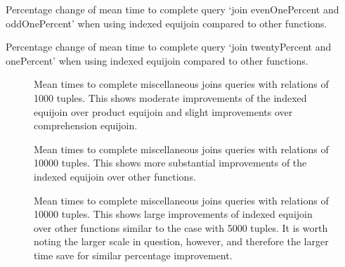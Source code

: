 \begin{table}[b]
    \centering
    
    \caption{Percentage change of mean time to complete query `join evenOnePercent and oddOnePercent' when using indexed equijoin compared to other functions.}
    \label{tab:percentage-change-of-means-join-evenOnePercent-and-oddOnePercent}
\end{table}

\begin{table}[b]
    \centering
    
    \caption{Percentage change of mean time to complete query `join twentyPercent and onePercent' when using indexed equijoin compared to other functions.}
    \label{tab:percentage-change-of-means-join-twentyPercent-and-onePercent}
\end{table}

\begin{figure}[p]
    
    \caption{Mean times to complete miscellaneous joins queries with relations
    of 1000 tuples. This shows moderate improvements of the indexed equijoin
over product equijoin and slight improvements over comprehension equijoin.}
    \label{fig:non-standard-1000}
\end{figure}

\begin{figure}[p]
    
    \caption{Mean times to complete miscellaneous joins queries with relations
    of 10000 tuples. This shows more substantial improvements of the indexed
equijoin over other functions.}
    \label{fig:non-standard-5000}
\end{figure}

\begin{figure}[p]
    
    \caption{Mean times to complete miscellaneous joins queries with relations
    of 10000 tuples. This shows large improvements of indexed equijoin over
other functions similar to the case with 5000 tuples. It is worth noting the
larger scale in question, however, and therefore the larger time save for
similar percentage improvement.}
    \label{fig:non-standard-10000}
\end{figure}

